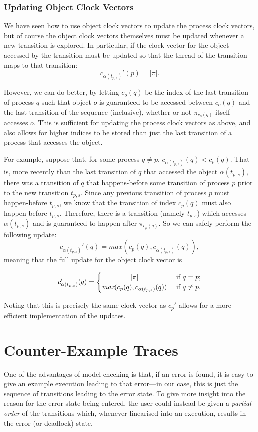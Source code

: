 \documentclass[12pt,a4paper,twoside,openright]{report}
\begin{document}
\subsubsection{Updating Object Clock Vectors}

We have seen how to use object clock vectors to
update the process clock vectors, but of course
the object clock vectors themselves must be
updated whenever a new transition is explored.
In particular, if the clock vector for the
object accessed by the transition must be
updated so that the thread of the transition
maps to that transition:
\[c_{\alpha(t_{p,s})}'(p) = |\pi|.\]

However, we can do better, by letting
$c_o(q)$ be the index of the
last transition of process
$q$ such that object $o$ is guaranteed to be
accessed between $c_o(q)$ and the last
transition of the sequence (inclusive),
whether or not $\pi_{c_o(q)}$ itself
accesses $o$.
This is sufficient for updating the
process clock vectors as above, and
also allows for higher indices to
be stored than just the last
transition of a process that
accesses the object.

For example, suppose that,
for some process $q \neq p$,
$c_{\alpha(t_{p,s})}(q) < c_p(q)$. That is,
more recently than the last transition of
$q$ that accessed the object $\alpha(t_{p,s})$,
there was a transition of $q$ that happens-before
some transition of process $p$ prior to the new
transition $t_{p,s}$. Since any previous
transition of process $p$ must happen-before
$t_{p,s}$, we know that the transition
of index $c_p(q)$ must also happen-before
$t_{p,s}$. Therefore, there is a transition
(namely $t_{p,s}$) which
accesses $\alpha(t_{p,s})$ and is guaranteed
to happen after $\pi_{c_p(q)}$. So we can
safely perform the following update:
\[ c_{\alpha(t_{p,s})}'(q) =\textit{max}(c_p(q),
c_{\alpha(t_{p,s})}(q)),
\]
meaning that the full update for the object
clock vector is

\[ c_{\alpha(t_{p,s})}'(q) =
\begin{cases}
\hfill |\pi| \hfill & \text{ if } q = p; \\
\hfill \textit{max}(c_p(q),
c_{\alpha(t_{p,s})}(q))
\hfill & \text{ if } q \neq p.
\end{cases}\]

Noting that this is precisely the same
clock vector as $c_p'$ allows for a
more efficient implementation of
the updates.

\section{Counter-Example Traces} \label{sec:traces}
One of the advantages of model checking
is that, if
an error is found, it is easy to
give an example execution leading
to that error---in
our case, this is just the sequence of
transitions leading to the error state.
To give more insight into the reason for the
error state being entered, the user could
instead be given a
\emph{partial order} of the transitions which,
whenever linearised into an execution,
results in the error (or deadlock) state.
\end{document}
